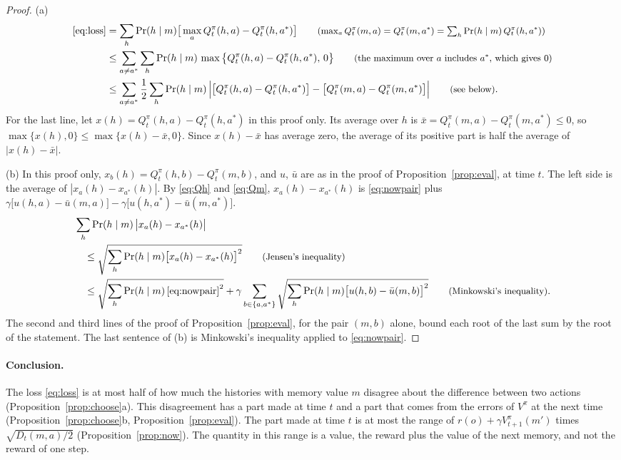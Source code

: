 \documentclass{article}
\theoremstyle{definition}
\numberwithin{equation}{section}
\newcommand{\why}[1]{\tag*{\small(#1)}}
\begin{document}
\begin{proof}
(a)
\begin{align*}
\eqref{eq:loss}&=\sum_h\Pr(h\mid m)\big[\max_aQ^\pi_t(h,a)-Q^\pi_t(h,a^*)\big] \why{$\max_aQ^\pi_t(m,a)=Q^\pi_t(m,a^*)=\sum_h\Pr(h\mid m)\,Q^\pi_t(h,a^*)$}\\
&\le\sum_{a\ne a^*}\sum_h\Pr(h\mid m)\,\max\big\{Q^\pi_t(h,a)-Q^\pi_t(h,a^*),\,0\big\} \why{the maximum over $a$ includes $a^*$, which gives $0$}\\
&\le\sum_{a\ne a^*}\frac12\sum_h\Pr(h\mid m)\,\Big|\big[Q^\pi_t(h,a)-Q^\pi_t(h,a^*)\big]-\big[Q^\pi_t(m,a)-Q^\pi_t(m,a^*)\big]\Big| \why{see below}.
\end{align*}
For the last line, let $x(h)=Q^\pi_t(h,a)-Q^\pi_t(h,a^*)$ in this proof only. Its average over $h$ is $\bar x=Q^\pi_t(m,a)-Q^\pi_t(m,a^*)\le0$, so $\max\{x(h),0\}\le\max\{x(h)-\bar x,0\}$. Since $x(h)-\bar x$ has average zero, the average of its positive part is half the average of $|x(h)-\bar x|$.

(b) In this proof only, $x_b(h)=Q^\pi_t(h,b)-Q^\pi_t(m,b)$, and $u$, $\bar u$ are as in the proof of Proposition~\ref{prop:eval}, at time $t$. The left side is the average of $|x_a(h)-x_{a^*}(h)|$. By \eqref{eq:Qh} and \eqref{eq:Qm}, $x_a(h)-x_{a^*}(h)$ is \eqref{eq:nowpair} plus $\gamma\big[u(h,a)-\bar u(m,a)\big]-\gamma\big[u(h,a^*)-\bar u(m,a^*)\big]$.
\begin{align*}
&\sum_h\Pr(h\mid m)\,\big|x_a(h)-x_{a^*}(h)\big|\\
&\quad\le\sqrt{\sum_h\Pr(h\mid m)\big[x_a(h)-x_{a^*}(h)\big]^2} \why{Jensen's inequality}\\
&\quad\le\sqrt{\sum_h\Pr(h\mid m)\,\eqref{eq:nowpair}^2}+\gamma\sum_{b\in\{a,a^*\}}\sqrt{\sum_h\Pr(h\mid m)\big[u(h,b)-\bar u(m,b)\big]^2} \why{Minkowski's inequality}.
\end{align*}
The second and third lines of the proof of Proposition~\ref{prop:eval}, for the pair $(m,b)$ alone, bound each root of the last sum by the root of the statement. The last sentence of (b) is Minkowski's inequality applied to \eqref{eq:nowpair}.
\end{proof}

\paragraph{Conclusion.} The loss \eqref{eq:loss} is at most half of how much the histories with memory value $m$ disagree about the difference between two actions (Proposition~\ref{prop:choose}a). This disagreement has a part made at time $t$ and a part that comes from the errors of $V^\pi$ at the next time (Proposition~\ref{prop:choose}b, Proposition~\ref{prop:eval}). The part made at time $t$ is at most the range of $r(o)+\gamma V^\pi_{t+1}(m')$ times $\sqrt{D_t(m,a)/2}$ (Proposition~\ref{prop:now}). The quantity in this range is a value, the reward plus the value of the next memory, and not the reward of one step.
\end{document}
